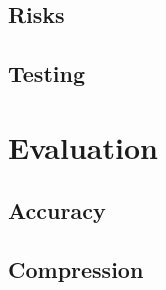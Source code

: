 \documentclass[12pt]{article}
\begin{document}
    \subsection{Risks}\label{subsec:risks}


    \subsection{Testing}\label{subsec:testing}


    \pagebreak


    \section{Evaluation}\label{sec:evaluation}


    \subsection{Accuracy}\label{subsec:accuracy}


    \subsection{Compression}\label{subsec:compression}

\end{document}

